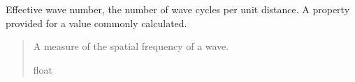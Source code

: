 \documentclass[letterpaper,10pt,english]{sphinxmanual}
\begin{document}
\begin{fulllineitems}
\begin{fulllineitems}
\label{\detokenize{modules/quantum/gravity_gradient:qnav.quantum.gravity_gradient.GravityGradInterferometer.k_eff}}
\pysigstartsignatures
{}
\pysigstopsignatures
\sphinxAtStartPar
Effective wave number, the number of wave cycles per unit distance.
A property provided for a value commonly calculated.
\begin{quote}\begin{description}
\sphinxAtStartPar
A measure of the spatial frequency of a wave.

\sphinxAtStartPar
float

\end{description}\end{quote}

\end{fulllineitems}


\end{fulllineitems}

\end{document}
